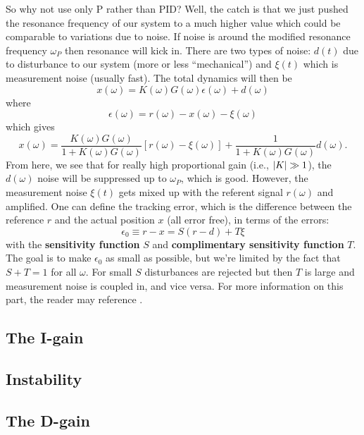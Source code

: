 \documentclass{article}
\theoremstyle{definition}
\newcommand{\f}[2]{\frac{#1}{#2}}
\begin{document}
So why not use only P rather than PID? Well, the catch is that we just pushed the resonance frequency of our system to a much higher value which could be comparable to variations due to noise. If noise is around the modified resonance frequency $\omega_P$ then resonance will kick in. There are two types of noise: $d(t)$ due to disturbance to our system (more or less ``mechanical'') and $\xi(t)$ which is measurement noise (usually fast). The total dynamics will then be 
\begin{equation*}
x(\omega) = K(\omega)G(\omega) \epsilon(\omega) + d(\omega)
\end{equation*}
where 
\begin{equation*}
\epsilon(\omega) = r(\omega) - x(\omega) - \xi(\omega)
\end{equation*}
which gives
\begin{equation*}
x(\omega) = \f{K(\omega)G(\omega)}{1+K(\omega)G(\omega)}[r(\omega)-\xi(\omega)] + \f{1}{1+K(\omega)G(\omega)}d(\omega).
\end{equation*}
From here, we see that for really high proportional gain (i.e., $\abs{K} \gg 1$), the $d(\omega)$ noise will be suppressed up to $\omega_P$, which is good. However, the measurement noise $\xi(t)$ gets mixed up with the referent signal $r(\omega)$ and amplified. One can define the tracking error, which is the difference between the reference $r$ and the actual position $x$ (all error free), in terms of the errors:
\begin{equation*}
\epsilon_0 \equiv r - x = S(r-d) + T\xi
\end{equation*}
with the \textbf{sensitivity function} $S$ and \textbf{complimentary sensitivity function} $T$. The goal is to make $\epsilon_0$ as small as possible, but we're limited by the fact that $S+T=1$ for all $\omega$. For small $S$ disturbances are rejected but then $T$ is large and measurement noise is coupled in, and vice versa.
For more information on this part, the reader may reference \cite{bechhoefer2005feedback}.


\subsection{The I-gain}



\subsection{Instability}

\subsection{The D-gain}
\end{document}
